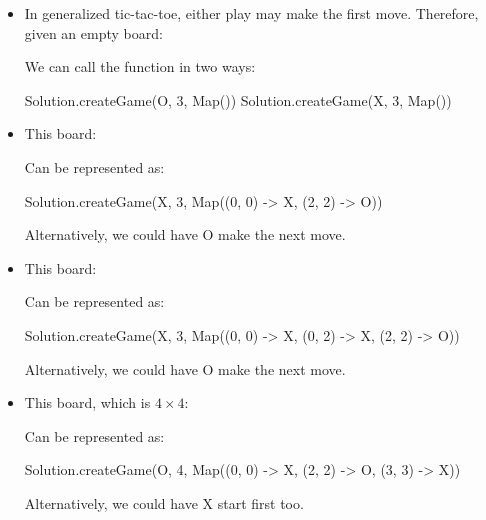 \documentclass{book}
\begin{document}
\begin{itemize}

  \item In generalized tic-tac-toe, either play may make the first move.
  Therefore, given an empty board:


  We can call the function in two ways:

  \begin{scalacode}
  Solution.createGame(O, 3, Map())
  Solution.createGame(X, 3, Map())
  \end{scalacode}

\item This board:


Can be represented as:
\begin{scalacode}
Solution.createGame(X, 3, Map((0, 0) -> X, (2, 2) -> O))
\end{scalacode}
Alternatively, we could have O make the next move.

\item This board:


Can be represented as:
\begin{scalacode}
Solution.createGame(X, 3, Map((0, 0) -> X, (0, 2) -> X, (2, 2) -> O))
\end{scalacode}
Alternatively, we could have O make the next move.


\item This board, which is $4 \times 4$:


Can be represented as:
\begin{scalacode}
Solution.createGame(O, 4, Map((0, 0) -> X, (2, 2) -> O, (3, 3) -> X))
\end{scalacode}
Alternatively, we could have X start first too.

\end{itemize}
\end{document}
